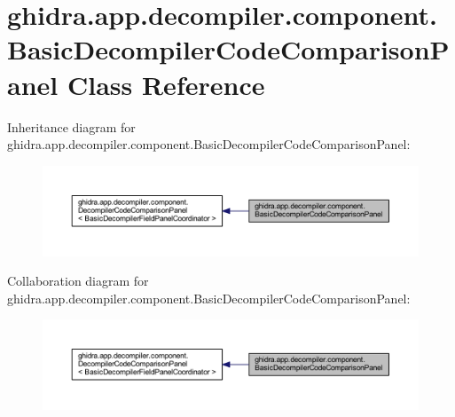 \hypertarget{classghidra_1_1app_1_1decompiler_1_1component_1_1_basic_decompiler_code_comparison_panel}{}\section{ghidra.\+app.\+decompiler.\+component.\+Basic\+Decompiler\+Code\+Comparison\+Panel Class Reference}
\label{classghidra_1_1app_1_1decompiler_1_1component_1_1_basic_decompiler_code_comparison_panel}


Inheritance diagram for ghidra.\+app.\+decompiler.\+component.\+Basic\+Decompiler\+Code\+Comparison\+Panel\+:
\nopagebreak
\begin{figure}[H]
\begin{center}
\leavevmode
\includegraphics[width=350pt]{classghidra_1_1app_1_1decompiler_1_1component_1_1_basic_decompiler_code_comparison_panel__inherit__graph}
\end{center}
\end{figure}


Collaboration diagram for ghidra.\+app.\+decompiler.\+component.\+Basic\+Decompiler\+Code\+Comparison\+Panel\+:
\nopagebreak
\begin{figure}[H]
\begin{center}
\leavevmode
\includegraphics[width=350pt]{classghidra_1_1app_1_1decompiler_1_1component_1_1_basic_decompiler_code_comparison_panel__coll__graph}
\end{center}
\end{figure}
